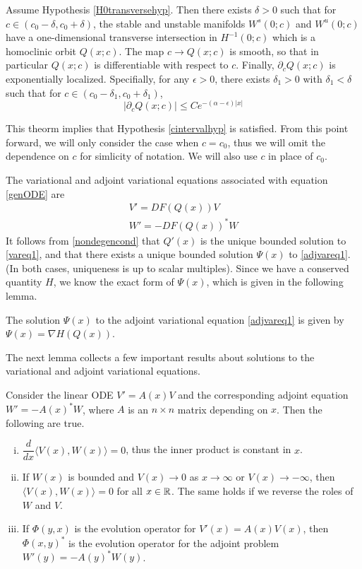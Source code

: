 \documentclass[thesis.tex]{subfiles}
\begin{document}
\begin{theorem}\label{transverseint}
Assume Hypothesis \ref{H0transversehyp}. Then there exists $\delta > 0$ such that for $c \in (c_0 - \delta, c_0 + \delta)$, the  stable and unstable manifolds $W^s(0; c)$ and $W^u(0; c)$ have a one-dimensional transverse intersection in $H^{-1}(0; c)$ which is a homoclinic orbit $Q(x; c)$. The map $c \rightarrow Q(x; c)$ is smooth, so that in particular $Q(x; c)$ is differentiable with respect to $c$. Finally, $\partial_c Q(x; c)$ is exponentially localized. Specifially, for any $\epsilon > 0$, there exists $\delta_1 > 0$ with $\delta_1 < \delta$ such that for $c \in (c_0 - \delta_1, c_0 + \delta_1)$,
\[
|\partial_c Q(x; c)| \leq C e^{-(\alpha - \epsilon)|x|}
\] 

\end{theorem}
 
This theorm implies that Hypothesis \ref{cintervalhyp} is satisfied. From this point forward, we will only consider the case when $c = c_0$, thus we will omit the dependence on $c$ for simlicity of notation. We will also use $c$ in place of $c_0$.

The variational and adjoint variational equations associated with equation \eqref{genODE} are
\begin{align}
V' = DF(Q(x)) V \label{vareq1} \\
W' = -DF(Q(x))^* W \label{adjvareq1}
\end{align}
It follows from \eqref{nondegencond} that $Q'(x)$ is the unique bounded solution to \eqref{vareq1}, and that there exists a unique bounded solution $\Psi(x)$ to \eqref{adjvareq1}. (In both cases, uniqueness is up to scalar multiples). Since we have a conserved quantity $H$, we know the exact form of $\Psi(x)$, which is given in the following lemma.

\begin{lemma}\label{psiform}
The solution $\Psi(x)$ to the adjoint variational equation \eqref{adjvareq1} is given by $\Psi(x) = \nabla H(Q(x))$.
\end{lemma}

The next lemma collects a few important results about solutions to the variational and adjoint variational equations.

\begin{lemma}\label{eigadjoint}
Consider the linear ODE $V' = A(x)V$ and the corresponding adjoint equation $W' = -A(x)^* W$, where $A$ is an $n \times n$ matrix depending on $x$. Then the following are true.
\begin{enumerate}[(i)]
\item $\dfrac{d}{dx}\langle V(x), W(x) \rangle = 0$, thus the inner product is constant in $x$.
\item If $W(x)$ is bounded and $V(x) \rightarrow 0$ as $x \rightarrow \infty$ or $V(x) \rightarrow -\infty$, then $\langle V(x), W(x) \rangle = 0$ for all $x \in {\mathbb R}$. The same holds if we reverse the roles of $W$ and $V$.
\item If $\Phi(y, x)$ is the evolution operator for $V'(x) = A(x)V(x)$, then $\Phi(x, y)^*$ is the evolution operator for the adjoint problem $W'(y) = -A(y)^* W(y)$.
\end{enumerate}
\end{lemma}
\end{document}
